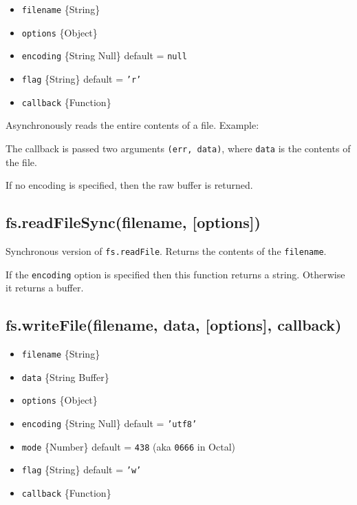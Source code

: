 \begin{itemize}
\itemsep1pt\parskip0pt
\item
  \texttt{filename} \{String\}
\item
  \texttt{options} \{Object\}
\item
  \texttt{encoding} \{String \textbar{} Null\} default = \texttt{null}
\item
  \texttt{flag} \{String\} default = \texttt{'r'}
\item
  \texttt{callback} \{Function\}
\end{itemize}

Asynchronously reads the entire contents of a file. Example:

\begin{Shaded}
\begin{Highlighting}[]
\NormalTok{(}\NormalTok{, } 
    
\NormalTok{\});}
\end{Highlighting}
\end{Shaded}

The callback is passed two arguments \texttt{(err, data)}, where
\texttt{data} is the contents of the file.

If no encoding is specified, then the raw buffer is returned.

\subsection{fs.readFileSync(filename,
{[}options{]})}\label{fs.readfilesyncfilename-options}

Synchronous version of \texttt{fs.readFile}. Returns the contents of the
\texttt{filename}.

If the \texttt{encoding} option is specified then this function returns
a string. Otherwise it returns a buffer.

\subsection{fs.writeFile(filename, data, {[}options{]},
callback)}\label{fs.writefilefilename-data-options-callback}

\begin{itemize}
\itemsep1pt\parskip0pt
\item
  \texttt{filename} \{String\}
\item
  \texttt{data} \{String \textbar{} Buffer\}
\item
  \texttt{options} \{Object\}
\item
  \texttt{encoding} \{String \textbar{} Null\} default = \texttt{'utf8'}
\item
  \texttt{mode} \{Number\} default = \texttt{438} (aka \texttt{0666} in
  Octal)
\item
  \texttt{flag} \{String\} default = \texttt{'w'}
\item
  \texttt{callback} \{Function\}
\end{itemize}

